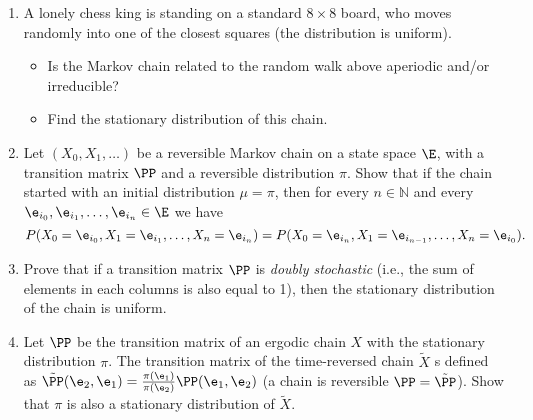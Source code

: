 \documentclass[a4paper,12pt]{article}
\begin{document}
 
\noindent
 {
\setlength\fboxsep{4pt}%
 \setlength\fboxrule{2pt}%
 } \bigskip\bigskip
\par \bigskip

 
  

\begin{enumerate}
\item A lonely chess king is standing on a standard $8\times  8$   board, who moves randomly into
one of the closest squares (the distribution is uniform).
\begin{itemize}
 \item  Is the Markov chain related to the random walk above aperiodic and/or irreducible?
 \item Find the stationary distribution of this chain.
\end{itemize}


\item 


Let $(X_0, X_1,\ldots)$ be a reversible Markov chain on a state space $\E$, with a transition matrix  $\PP$ and a reversible distribution $\pi$.
 Show that if the chain started with an initial
distribution $\mu=\pi$,  then for every  $n\in\mathbb{N}$  and every 
$\e_{i_0},\e_{i_1},\ldots,\e_{i_n}\in \E$  we have
$$P(X_0=\e_{i_0}, X_1=\e_{i_1}, \ldots, X_n=\e_{i_n}) = P(X_0=\e_{i_n}, X_1=\e_{i_{n-1}}, \ldots, X_n=\e_{i_0}).$$

\item 

Prove that if a transition matrix $\PP$ is \textsl{ doubly stochastic}
(i.e., the sum of elements in
each columns is also equal to 1), then the stationary distribution of the chain  is uniform.


\item 
Let  $\PP$ be the transition matrix of an ergodic chain  $X$ with the stationary distribution $\pi$. 
The transition matrix of the time-reversed chain $\tilde{X}$  s defined as  $\tilde{\PP}(\e_2,\e_1)={\pi(\e_1)\over \pi(\e_2)} \PP(\e_1,\e_2)$
(a chain is reversible  $\PP=\tilde{\PP}$). Show that $\pi$ is also a stationary distribution of   $\tilde{X}$.




\end{enumerate}
\end{document}
